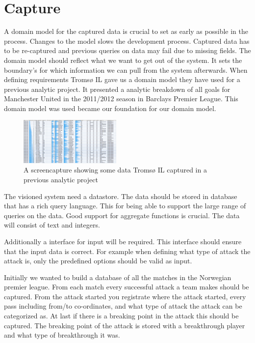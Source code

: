 \section{Capture}

A domain model for the captured data is crucial to set as early as possible in the process.  Changes to the model slows the development process. Captured data has to be re-captured and previous queries on data may fail due to missing fields. The domain model should reflect what we want to get out of the system. It sets the boundary's for which information we can pull from the system afterwards. When defining requirements Tromsø IL gave us a domain model they have used for a previous analytic project. It presented a analytic breakdown of all goals for Manchester United in the 2011/2012 season in Barclays Premier League. This domain model was used became our foundation for our domain model.

\begin{figure}[ht!]
\centering
\includegraphics[width=50mm]{images/general/prev_domain_model.png}
\caption{A screencapture showing some data Tromsø IL captured in a previous analytic project}
\label{overflow}
\end{figure}

The visioned system need a datastore. The data should be stored in database that has a rich query language. This for being able to support the large range of queries on the data. Good support for aggregate functions is crucial.  The data will consist of text and integers.

Additionally a interface for input will be required. This interface should ensure that the input data is correct. For example when defining what type of attack the attack is, only the predefined options should be valid as input. 

Initially we wanted to build a database of all the matches in the Norwegian premier league. From each match every successful attack a team makes should be captured. From the attack started you registrate where the attack started, every pass including from/to co-ordinates, and what type of attack the attack can be categorized as. At last if there is a breaking point in the attack this should be captured. The breaking point of the attack is stored with a breakthrough player and what type of breakthrough it was.


